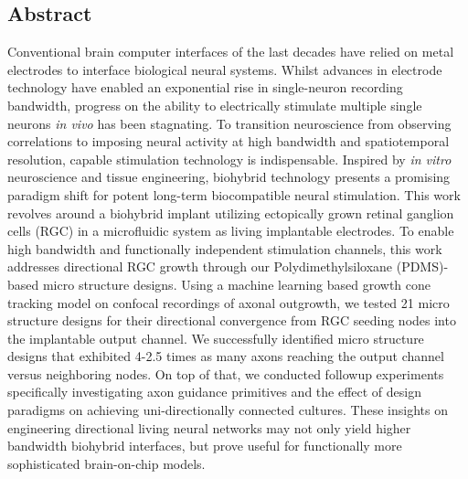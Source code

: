 \thispagestyle{plain}
\begin{center}
    \section{Abstract}
    \vspace{0.4cm}
\end{center}

Conventional brain computer interfaces of the last decades have relied on metal
electrodes to interface biological neural systems. Whilst advances in electrode
technology have enabled an exponential rise in single-neuron recording
bandwidth, progress on the ability to electrically stimulate multiple single
neurons \textit{in vivo} has been stagnating. To transition neuroscience from
observing correlations to imposing neural activity at high bandwidth and
spatiotemporal resolution, capable stimulation technology is indispensable.
Inspired by \textit{in vitro} neuroscience and tissue engineering, biohybrid
technology presents a promising paradigm shift for potent long-term
biocompatible neural stimulation. This work revolves around a biohybrid implant
utilizing ectopically grown retinal ganglion cells (RGC) in a microfluidic
system as living implantable electrodes. To enable high bandwidth and
functionally independent stimulation channels, this work addresses directional
RGC growth through our Polydimethylsiloxane (PDMS)-based micro structure
designs. Using a machine learning based growth cone tracking model on confocal
recordings of axonal outgrowth, we tested 21 micro structure designs for their
directional convergence from RGC seeding nodes into the implantable output
channel. We successfully identified micro structure designs that exhibited 4-2.5
times as many axons reaching the output channel versus neighboring nodes. On top
of that, we conducted followup experiments specifically investigating axon
guidance primitives and the effect of design paradigms on achieving
uni-directionally connected cultures. These insights on engineering directional
living neural networks may not only yield higher bandwidth biohybrid interfaces,
but prove useful for functionally more sophisticated brain-on-chip models. 